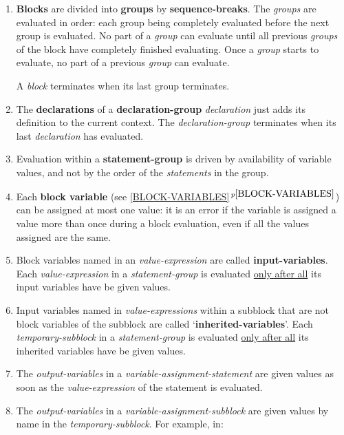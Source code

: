 \documentclass[12pt]{article}
\newcommand{\key}[1]{{\rm \bfseries #1}}
\newcommand{\itemref}[1]{\ref{#1}$\,^{p\pageref{#1}}$}
\begin{document}
\begin{enumerate}

\item
\key{Blocks}
are divided into \key{groups} by \key{sequence-breaks}.
The {\em groups} are evaluated in order: each group being completely
evaluated before the next group is evaluated.  No part of a {\em group}
can evaluate until all previous {\em groups} of the block have completely
finished evaluating.  Once a {\em group} starts to evaluate, no part of
a previous {\em group} can evaluate.

A {\em block} terminates when its last group terminates.

\item
The \key{declarations} of a
\key{declaration-group}
{\em declaration} just adds its definition to the current context.
The {\em declaration-group} terminates when its last {\em declaration}
has evaluated.

\item
Evaluation within a \key{statement-group}
is driven by availability of variable values,
and not by the order of the {\em statements} in the group.

\item
Each \key{block variable} (see \itemref{BLOCK-VARIABLES}) can be assigned at most one value: it is
an error if the variable is assigned a value more than once during
a block evaluation, even if all the values assigned are the same.

\item
Block variables named in an {\em value-expression}
are called \key{input-variables}.
Each {\em value-expres\-sion} in a {\em statement-group}
is evaluated \underline{only after all} its input variables have be
given values.

\item
Input variables named in {\em value-expressions} within a
subblock that are not block variables of the
subblock are called `\key{inherited-variables}'.
Each {\em temporary-subblock} in a {\em statement-group}
is evaluated \underline{only after all} its inherited variables have be
given values.

\item
The {\em output-variables} in a {\em variable-assignment-statement}
are given values as soon as the {\em value-expression} of the
statement is evaluated.

\item
The {\em output-variables} in a {\em variable-assignment-subblock}
are given values by name in the {\em temporary-subblock}.  For example,
in:


\end{enumerate}
\end{document}
